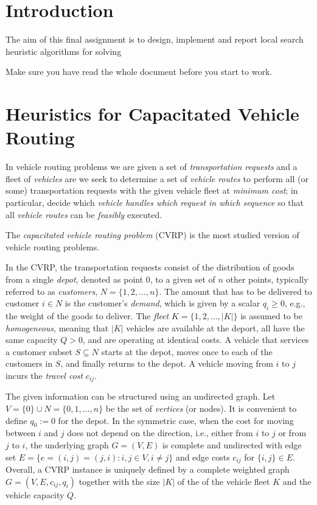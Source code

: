\section*{Introduction}

The aim of this final assignment is to design, implement and report local
search heuristic algorithms for solving



\medskip
Make sure you have read the whole document before you start to work.


\section*{Heuristics for Capacitated Vehicle Routing}

In vehicle routing problems we are given a set of \emph{transportation
  requests} and a fleet of \emph{vehicles} are we seek to determine a
set of \emph{vehicle routes} to perform all (or some) transportation
requests with the given vehicle fleet at \emph{minimum cost}; in
particular, decide which \emph{vehicle handles which request in which
  sequence} so that all \emph{vehicle routes} can be \emph{feasibly}
executed.

The \emph{capacitated vehicle routing problem} (CVRP) is the most studied
version of vehicle routing problems.

In the CVRP, the transportation requests consist of the distribution of
goods from a single \emph{depot}, denoted as point $0$, to a given set
of $n$ other points, typically referred to as \emph{customers},
$N=\{1,2,\ldots,n\}$. The amount that has to be delivered to customer
$i\in N$ is the customer's \emph{demand}, which is given by a scalar
$q_i\geq 0 $, e.g., the weight of the goods to deliver. The \emph{fleet}
$K=\{1,2,\ldots,|K|\}$ is assumed to be \emph{homogeneous}, meaning that
$|K|$ vehicles are available at the deport, all have the same capacity
$Q>0$, and are operating at identical costs. A vehicle that services a
customer subset $S\subseteq N$ starts at the depot, moves once to each
of the customers in $S$, and finally returns to the depot. A vehicle
moving from $i$ to $j$ incurs the \emph{travel cost} $c_{ij}$.

The given information can be structured using an undirected graph. Let
$V=\{0\}\cup N=\{0,1,\ldots,n\}$ be the set of \emph{vertices} (or
nodes). It is convenient to define $q_0:=0$ for the depot. In the
symmetric case, when the cost
for moving between $i$ and $j$ does not depend on the direction, i.e.,
either from $i$ to $j$ or from $j$ to $i$, the underlying graph
$G=(V,E)$ is complete and undirected with edge set $E=\{e=(i,j)=(j,i) :
i,j\in V,i\neq j\}$ and edge costs $c_{ij}$ for $\{i,j\} \in E$.
Overall, a CVRP instance is uniquely defined by a complete weighted graph
$G=(V,E,c_{ij},q_i)$ together with the size $|K|$ of the of the vehicle
fleet $K$ and the vehicle capacity $Q$.

